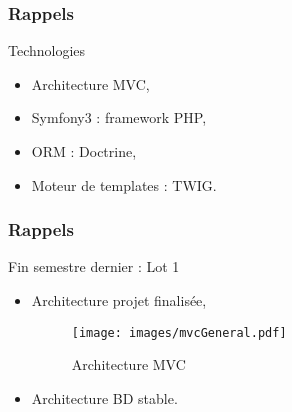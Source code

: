 \speaker{\Francois}

\begin{frame}
\frametitle{Rappels}
\begin{block}{Technologies}
	\begin{itemize}
		\item Architecture MVC,
		\item Symfony3 : framework PHP,
		\item ORM : Doctrine,
		\item Moteur de templates : TWIG.
	\end{itemize}
\end{block}
\end{frame}

\begin{frame}
\frametitle{Rappels}
\begin{block}{Fin semestre dernier : Lot 1}
	\begin{itemize}
		\item Architecture projet finalisée,
		\begin{figure}[!h]
			\begin{center}
				\texttt{[image: images/mvcGeneral.pdf]}
				\caption{Architecture MVC}
			\end{center}
		\end{figure}
		\item Architecture BD stable.
	\end{itemize}
\end{block}
\end{frame}